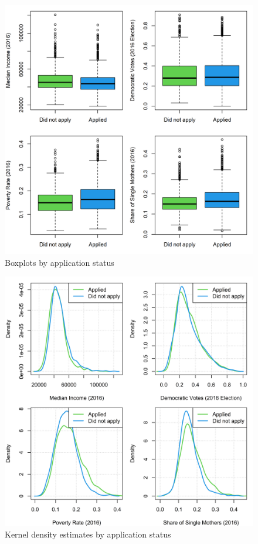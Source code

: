 \begin{figure}[!h]
	\centering
	\includegraphics[scale=1]{"../Code & Data/AssistanceCovBoxplot.png"}
	\caption{Boxplots by application status}
	\label{AssistCovBoxplot}
\end{figure}



\begin{figure}[!h]
	\centering
	\includegraphics[scale=1]{"../Code & Data/AssistanceCovDensity.png"}
	\caption{Kernel density estimates by application status}
	\label{AssistCovDensity}
\end{figure}


